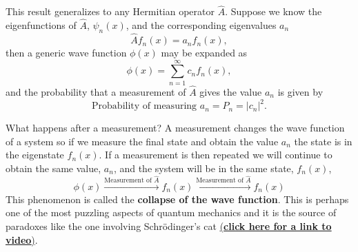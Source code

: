 \documentclass[../Main/chem331-notes.tex]{subfiles}
\begin{document}
This result generalizes to any Hermitian operator $\hat{A}$. Suppose we know the eigenfunctions of $\hat{A}$, $\psi_n(x)$, and the corresponding eigenvalues $a_n$
\begin{equation}
\hat{A} f_n(x) = a_n f_n(x),
\end{equation}
then a generic wave function $\phi(x)$ may be expanded as
\begin{equation}
\phi(x) = \sum_{n = 1}^\infty c_n f_n(x),
\end{equation}
 and the probability that a measurement of $\hat{A}$ gives the value $a_n$ is given by
 \begin{equation}
\text{Probability of measuring } a_n = P_n = |c_n|^2.
\end{equation}

What happens after a measurement? A measurement changes the wave function of a system so if we measure the final state and obtain the value $a_n$ the state is in the eigenstate $f_n(x)$.
 If a measurement is then repeated we will continue to obtain the same value, $a_n$, and the system will be in the same state, $f_n(x)$,
\begin{equation}
\phi(x) \xrightarrow{\text{Measurement  of }\hat{A}}{} f_n(x) \xrightarrow{\text{Measurement  of }\hat{A}}{} f_n(x)
\end{equation}
 This phenomenon is called the \textbf{collapse of the wave function}.
This is perhaps one of the most puzzling aspects of quantum mechanics and it is the source of paradoxes like the one involving Schr\"{o}dinger's cat \href{https://ed.ted.com/lessons/schrodinger-s-cat-a-thought-experiment-in-quantum-mechanics-chad-orzel}{(\textbf{click here for a link to video})}.
\end{document}
